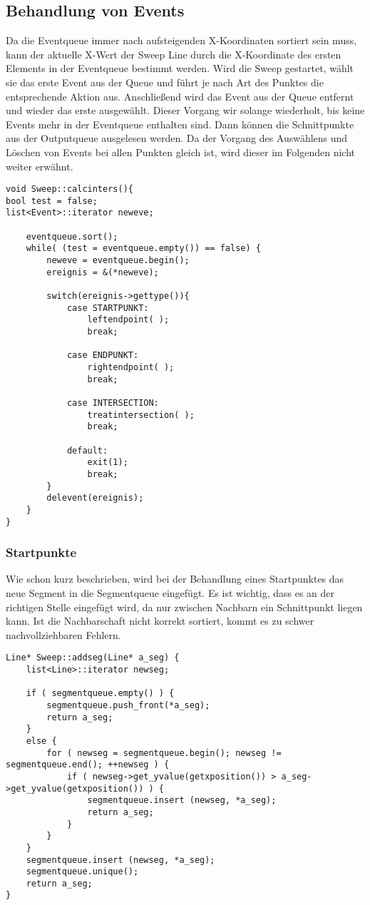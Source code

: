 \subsection{Behandlung von Events}
Da die Eventqueue immer nach aufsteigenden X-Koordinaten sortiert sein muss, kann der aktuelle X-Wert der Sweep Line durch die X-Koordinate des ersten Elements in der Eventqueue bestimmt werden. Wird die Sweep gestartet, wählt sie das erste Event aus der Queue und führt je nach Art des Punktes die entsprechende Aktion aus. Anschließend wird das Event aus der Queue entfernt und wieder das erste ausgewählt. Dieser Vorgang wir solange wiederholt, bis keine Events mehr in der Eventqueue enthalten sind. Dann können die Schnittpunkte aus der Outputqueue ausgelesen werden. Da der Vorgang des Auswählens und Löschen von Events bei allen Punkten gleich ist, wird dieser im Folgenden nicht weiter erwähnt.
\begin{lstlisting}[captionpos=b, caption={Schleife der Sweep Line}, label=A3:Sweeprun]
void Sweep::calcinters(){
bool test = false;
list<Event>::iterator neweve;

	eventqueue.sort();
	while( (test = eventqueue.empty()) == false) {
		neweve = eventqueue.begin();
		ereignis = &(*neweve);

		switch(ereignis->gettype()){
			case STARTPUNKT:
				leftendpoint( );
				break;

			case ENDPUNKT:
				rightendpoint( );
				break;

			case INTERSECTION:
				treatintersection( );
				break;

			default:
				exit(1);
				break;
		}
		delevent(ereignis);
	}
}
\end{lstlisting}


\subsubsection{Startpunkte}
Wie schon kurz beschrieben, wird bei der Behandlung eines Startpunktes das neue Segment in die Segmentqueue eingefügt. Es ist wichtig, dass es an der richtigen Stelle eingefügt wird, da nur zwischen Nachbarn ein Schnittpunkt liegen kann. Ist die Nachbarschaft nicht korrekt sortiert, kommt es zu schwer nachvollziehbaren Fehlern.
\begin{lstlisting}[captionpos=b, caption={Einfügen von Segmenten in die Sweep Line}, label=A3:addseg]
Line* Sweep::addseg(Line* a_seg) {
	list<Line>::iterator newseg;

	if ( segmentqueue.empty() ) {
		segmentqueue.push_front(*a_seg);
		return a_seg;
	}
	else {
		for ( newseg = segmentqueue.begin(); newseg != segmentqueue.end(); ++newseg ) {
			if ( newseg->get_yvalue(getxposition()) > a_seg->get_yvalue(getxposition()) ) {
				segmentqueue.insert (newseg, *a_seg);
				return a_seg;
			}
		}
	}
	segmentqueue.insert (newseg, *a_seg);
	segmentqueue.unique();
	return a_seg;
}
\end{lstlisting}

